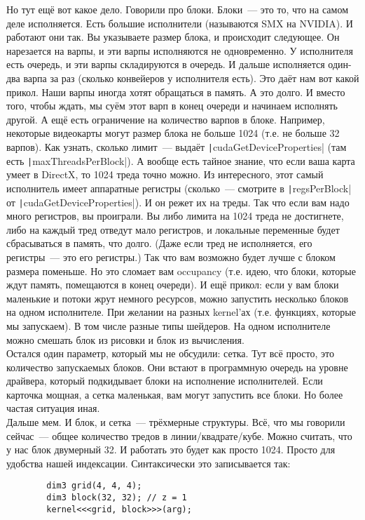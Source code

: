 \documentclass{article}
\begin{document}
    Но тут ещё вот какое дело. Говорили про блоки. Блоки~--- это то, что на самом деле исполняется. Есть большие исполнители (называются SMX на NVIDIA). И работают они так. Вы указываете размер блока, и происходит следующее. Он нарезается на варпы, и эти варпы исполняются не одновременно. У исполнителя есть очередь, и эти варпы складируются в очередь. И дальше исполняется один-два варпа за раз (сколько конвейеров у исполнителя есть). Это даёт нам вот какой прикол. Наши варпы иногда хотят обращаться в память. А это долго. И вместо того, чтобы ждать, мы суём этот варп в конец очереди и начинаем исполнять другой. А ещё есть ограничение на количество варпов в блоке. Например, некоторые видеокарты могут размер блока не больше 1024 (т.е. не больше 32 варпов). Как узнать, сколько лимит~--- выдаёт \texttt|cudaGetDeviceProperties| (там есть \texttt|maxThreadsPerBlock|). А вообще есть тайное знание, что если ваша карта умеет в DirectX, то 1024 треда точно можно. Из интересного, этот самый исполнитель имеет аппаратные регистры (сколько~--- смотрите в \texttt|regsPerBlock| от \texttt|cudaGetDeviceProperties|). И он режет их на треды. Так что если вам надо много регистров, вы проиграли. Вы либо лимита на 1024 треда не достигнете, либо на каждый тред отведут мало регистров, и локальные переменные будет сбрасываться в память, что долго. (Даже если тред не исполняется, его регистры~--- это его регистры.) Так что вам возможно будет лучше с блоком размера поменьше. Но это сломает вам occupancy (т.е. идею, что блоки, которые ждут память, помещаются в конец очереди). И ещё прикол: если у вам блоки маленькие и потоки жрут немного ресурсов, можно запустить несколько блоков на одном исполнителе. При желании на разных kernel'ах (т.е. функциях, которые мы запускаем). В том числе разные типы шейдеров. На одном исполнителе можно смешать блок из рисовки и блок из вычисления.\\
    Остался один параметр, который мы не обсудили: сетка. Тут всё просто, это количество запускаемых блоков. Они встают в программную очередь на уровне драйвера, который подкидывает блоки на исполнение исполнителей. Если карточка мощная, а сетка маленькая, вам могут запустить все блоки. Но более частая ситуация иная.\\
    Дальше мем. И блок, и сетка~--- трёхмерные структуры. Всё, что мы говорили сейчас~--- общее количество тредов в линии/квадрате/кубе. Можно считать, что у нас блок двумерный 32. И работать это будет как просто 1024. Просто для удобства нашей индексации. Синтаксически это записывается так:
    \begin{verbatim}
        dim3 grid(4, 4, 4);
        dim3 block(32, 32); // z = 1
        kernel<<<grid, block>>>(arg);
    \end{verbatim}
\end{document}
